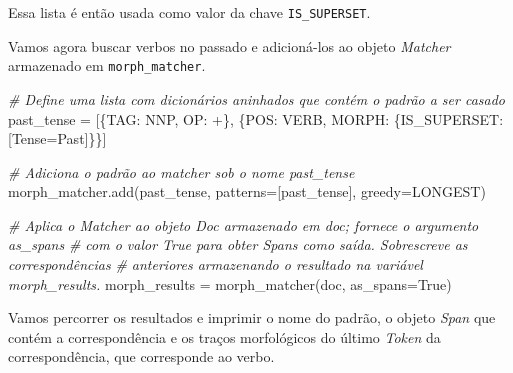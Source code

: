 \documentclass[
  brazilian,
]{article}
\newenvironment{Shaded}{}{}
\newcommand{\CommentTok}[1]{\textcolor[rgb]{0.38,0.63,0.69}{\textit{#1}}}
\newcommand{\NormalTok}[1]{#1}
\newcommand{\OperatorTok}[1]{\textcolor[rgb]{0.40,0.40,0.40}{#1}}
\newcommand{\StringTok}[1]{\textcolor[rgb]{0.25,0.44,0.63}{#1}}
\newcommand{\VariableTok}[1]{\textcolor[rgb]{0.10,0.09,0.49}{#1}}
\begin{document}
Essa lista é então usada como valor da chave \texttt{IS\_SUPERSET}.

Vamos agora buscar verbos no passado e adicioná-los ao objeto
\emph{Matcher} armazenado em \texttt{morph\_matcher}.

\begin{Shaded}
\begin{Highlighting}[]
\CommentTok{\# Define uma lista com dicionários aninhados que contém o padrão a ser casado}
\NormalTok{past\_tense }\OperatorTok{=}\NormalTok{ [\{}\StringTok{\textquotesingle{}TAG\textquotesingle{}}\NormalTok{: }\StringTok{\textquotesingle{}NNP\textquotesingle{}}\NormalTok{, }\StringTok{\textquotesingle{}OP\textquotesingle{}}\NormalTok{: }\StringTok{\textquotesingle{}+\textquotesingle{}}\NormalTok{\},}
\NormalTok{              \{}\StringTok{\textquotesingle{}POS\textquotesingle{}}\NormalTok{: }\StringTok{\textquotesingle{}VERB\textquotesingle{}}\NormalTok{, }\StringTok{\textquotesingle{}MORPH\textquotesingle{}}\NormalTok{: \{}\StringTok{\textquotesingle{}IS\_SUPERSET\textquotesingle{}}\NormalTok{: [}\StringTok{\textquotesingle{}Tense=Past\textquotesingle{}}\NormalTok{]\}\}]}

\CommentTok{\# Adiciona o padrão ao matcher sob o nome \textquotesingle{}past\_tense\textquotesingle{}}
\NormalTok{morph\_matcher.add(}\StringTok{\textquotesingle{}past\_tense\textquotesingle{}}\NormalTok{, patterns}\OperatorTok{=}\NormalTok{[past\_tense], greedy}\OperatorTok{=}\StringTok{\textquotesingle{}LONGEST\textquotesingle{}}\NormalTok{)}

\CommentTok{\# Aplica o Matcher ao objeto Doc armazenado em \textquotesingle{}doc\textquotesingle{}; fornece o argumento \textquotesingle{}as\_spans\textquotesingle{}}
\CommentTok{\# com o valor True para obter Spans como saída. Sobrescreve as correspondências}
\CommentTok{\# anteriores armazenando o resultado na variável \textquotesingle{}morph\_results\textquotesingle{}.}
\NormalTok{morph\_results }\OperatorTok{=}\NormalTok{ morph\_matcher(doc, as\_spans}\OperatorTok{=}\VariableTok{True}\NormalTok{)}
\end{Highlighting}
\end{Shaded}

Vamos percorrer os resultados e imprimir o nome do padrão, o objeto
\emph{Span} que contém a correspondência e os traços morfológicos do
último \emph{Token} da correspondência, que corresponde ao verbo.
\end{document}
